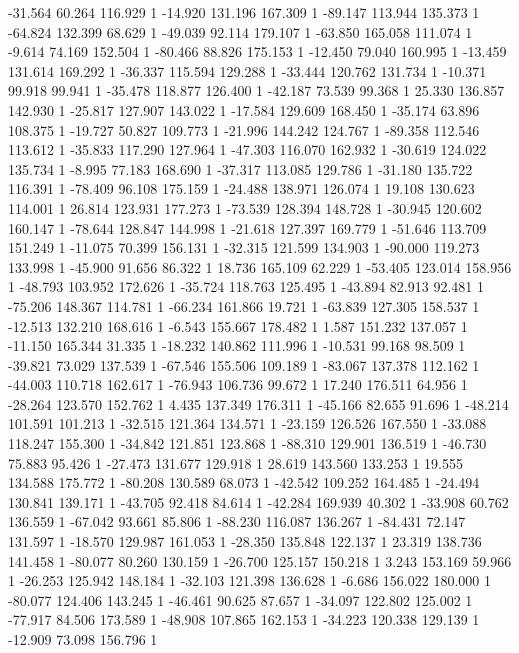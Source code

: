 	-31.564 60.264 116.929 1
	-14.920 131.196 167.309 1
	-89.147 113.944 135.373 1
	-64.824 132.399 68.629 1
	-49.039 92.114 179.107 1
	-63.850 165.058 111.074 1
	-9.614 74.169 152.504 1
	-80.466 88.826 175.153 1
	-12.450 79.040 160.995 1
	-13.459 131.614 169.292 1
	-36.337 115.594 129.288 1
	-33.444 120.762 131.734 1
	-10.371 99.918 99.941 1
	-35.478 118.877 126.400 1
	-42.187 73.539 99.368 1
	25.330 136.857 142.930 1
	-25.817 127.907 143.022 1
	-17.584 129.609 168.450 1
	-35.174 63.896 108.375 1
	-19.727 50.827 109.773 1
	-21.996 144.242 124.767 1
	-89.358 112.546 113.612 1
	-35.833 117.290 127.964 1
	-47.303 116.070 162.932 1
	-30.619 124.022 135.734 1
	-8.995 77.183 168.690 1
	-37.317 113.085 129.786 1
	-31.180 135.722 116.391 1
	-78.409 96.108 175.159 1
	-24.488 138.971 126.074 1
	19.108 130.623 114.001 1
	26.814 123.931 177.273 1
	-73.539 128.394 148.728 1
	-30.945 120.602 160.147 1
	-78.644 128.847 144.998 1
	-21.618 127.397 169.779 1
	-51.646 113.709 151.249 1
	-11.075 70.399 156.131 1
	-32.315 121.599 134.903 1
	-90.000 119.273 133.998 1
	-45.900 91.656 86.322 1
	18.736 165.109 62.229 1
	-53.405 123.014 158.956 1
	-48.793 103.952 172.626 1
	-35.724 118.763 125.495 1
	-43.894 82.913 92.481 1
	-75.206 148.367 114.781 1
	-66.234 161.866 19.721 1
	-63.839 127.305 158.537 1
	-12.513 132.210 168.616 1
	-6.543 155.667 178.482 1
	1.587 151.232 137.057 1
	-11.150 165.344 31.335 1
	-18.232 140.862 111.996 1
	-10.531 99.168 98.509 1
	-39.821 73.029 137.539 1
	-67.546 155.506 109.189 1
	-83.067 137.378 112.162 1
	-44.003 110.718 162.617 1
	-76.943 106.736 99.672 1
	17.240 176.511 64.956 1
	-28.264 123.570 152.762 1
	4.435 137.349 176.311 1
	-45.166 82.655 91.696 1
	-48.214 101.591 101.213 1
	-32.515 121.364 134.571 1
	-23.159 126.526 167.550 1
	-33.088 118.247 155.300 1
	-34.842 121.851 123.868 1
	-88.310 129.901 136.519 1
	-46.730 75.883 95.426 1
	-27.473 131.677 129.918 1
	28.619 143.560 133.253 1
	19.555 134.588 175.772 1
	-80.208 130.589 68.073 1
	-42.542 109.252 164.485 1
	-24.494 130.841 139.171 1
	-43.705 92.418 84.614 1
	-42.284 169.939 40.302 1
	-33.908 60.762 136.559 1
	-67.042 93.661 85.806 1
	-88.230 116.087 136.267 1
	-84.431 72.147 131.597 1
	-18.570 129.987 161.053 1
	-28.350 135.848 122.137 1
	23.319 138.736 141.458 1
	-80.077 80.260 130.159 1
	-26.700 125.157 150.218 1
	3.243 153.169 59.966 1
	-26.253 125.942 148.184 1
	-32.103 121.398 136.628 1
	-6.686 156.022 180.000 1
	-80.077 124.406 143.245 1
	-46.461 90.625 87.657 1
	-34.097 122.802 125.002 1
	-77.917 84.506 173.589 1
	-48.908 107.865 162.153 1
	-34.223 120.338 129.139 1
	-12.909 73.098 156.796 1
